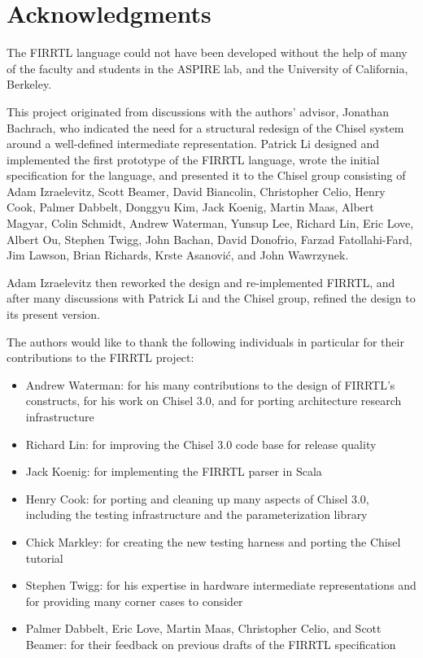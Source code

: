 \documentclass[12pt]{article}
\begin{document}
\section{Acknowledgments}
The FIRRTL language could not have been developed without the help of many of the faculty and students in the ASPIRE lab, and the University of California, Berkeley.

This project originated from discussions with the authors' advisor, Jonathan Bachrach, who indicated the need for a structural redesign of the Chisel system around a well-defined intermediate representation. Patrick Li designed and implemented the first prototype of the FIRRTL language, wrote the initial specification for the language, and presented it to the Chisel group consisting of Adam Izraelevitz, Scott Beamer, David Biancolin, Christopher Celio, Henry Cook, Palmer Dabbelt, Donggyu Kim, Jack Koenig, Martin Maas, Albert Magyar, Colin Schmidt, Andrew Waterman, Yunsup Lee, Richard Lin, Eric Love, Albert Ou, Stephen Twigg, John Bachan, David Donofrio, Farzad Fatollahi-Fard, Jim Lawson, Brian Richards, Krste Asanovi\'c, and John Wawrzynek.

Adam Izraelevitz then reworked the design and re-implemented FIRRTL, and after many discussions with Patrick Li and the Chisel group, refined the design to its present version.

The authors would like to thank the following individuals in particular for their contributions to the FIRRTL project:
\begin{itemize}
\item Andrew Waterman: for his many contributions to the design of FIRRTL's constructs, for his work on Chisel 3.0, and for porting architecture research infrastructure
\item Richard Lin: for improving the Chisel 3.0 code base for release quality
\item Jack Koenig: for implementing the FIRRTL parser in Scala
\item Henry Cook: for porting and cleaning up many aspects of Chisel 3.0, including the testing infrastructure and the parameterization library
\item Chick Markley: for creating the new testing harness and porting the Chisel tutorial
\item Stephen Twigg: for his expertise in hardware intermediate representations and for providing many corner cases to consider
\item Palmer Dabbelt, Eric Love, Martin Maas, Christopher Celio, and Scott Beamer: for their feedback on previous drafts of the FIRRTL specification
\end{itemize}
\end{document}
